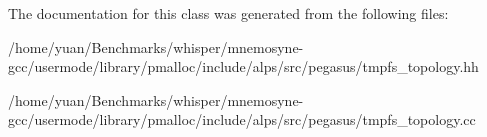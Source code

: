 The documentation for this class was generated from the following files\+:\begin{DoxyCompactItemize}
\item 
/home/yuan/\+Benchmarks/whisper/mnemosyne-\/gcc/usermode/library/pmalloc/include/alps/src/pegasus/tmpfs\+\_\+topology.\+hh\item 
/home/yuan/\+Benchmarks/whisper/mnemosyne-\/gcc/usermode/library/pmalloc/include/alps/src/pegasus/tmpfs\+\_\+topology.\+cc\end{DoxyCompactItemize}
